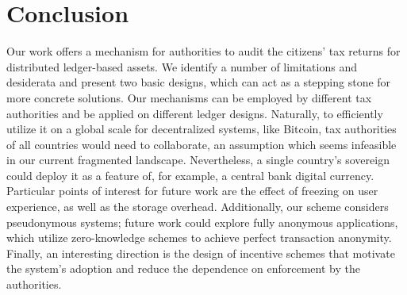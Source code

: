 \section{Conclusion}\label{sec:conclusion}

Our work offers a mechanism for authorities to audit the citizens' tax returns
for distributed ledger-based assets. We identify a number of limitations and
desiderata and present two basic designs, which can act as a stepping stone for
more concrete solutions. Our mechanisms can be employed by different tax
authorities and be applied on different ledger designs. Naturally, to
efficiently utilize it on a global scale for decentralized systems, like
Bitcoin, tax authorities of all countries would need to collaborate, an
assumption which seems infeasible in our current fragmented landscape.
Nevertheless, a single country's sovereign could deploy it as a feature of, for
example, a central bank digital currency.  Particular points of interest for
future work are the effect of freezing on user experience, as well as the
storage overhead. Additionally, our scheme considers pseudonymous systems;
future work could explore fully anonymous applications, which utilize
zero-knowledge schemes to achieve perfect transaction anonymity. Finally, an
interesting direction is the design of incentive schemes that motivate the
system's adoption and reduce the dependence on enforcement by the authorities.
